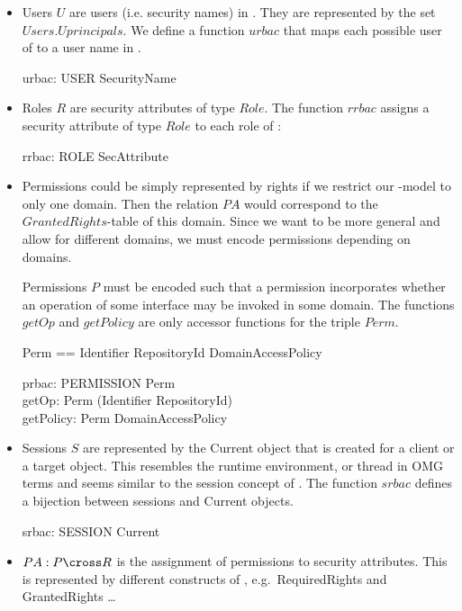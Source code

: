 \begin{itemize}
\item Users $U$ are users (i.e. security names) in \corbasec.  They are
  represented by the set $Users.Uprincipals$.  We define a function $urbac$ that
  maps each possible user of \rbaci{} to a user name in \corbasec.
  \begin{axdef}
    urbac: USER \bij SecurityName \\
  \end{axdef}
\item Roles $R$ are security attributes of type $Role$.  The function $rrbac$
  assigns a security attribute of type $Role$ to each role of \rbaci:
  \begin{axdef}
    rrbac: ROLE \bij SecAttribute \\    
  \end{axdef}
\item Permissions could be simply represented by rights if we restrict our
  \corba -model to only one domain.  Then the relation $PA$ would correspond to
  the $GrantedRights$-table of this domain.  Since we want to be more general
  and allow for different domains, we must encode permissions depending on
  domains.
  
  Permissions $P$ must be encoded such that a permission incorporates whether an
  operation of some interface may be invoked in some domain.  The functions
  $getOp$ and $getPolicy$ are only accessor functions for the triple $Perm$.
  \begin{zed}
    Perm == Identifier \cross RepositoryId \cross DomainAccessPolicy \\
  \end{zed}
  \begin{axdef}
    prbac: PERMISSION \fun Perm \\
    getOp: Perm \fun (Identifier \cross RepositoryId) \\
    getPolicy: Perm \fun DomainAccessPolicy \\
  \end{axdef}
  
\item Sessions $S$ are represented by the Current object that is created for a
  client or a target object.  This resembles the runtime environment, or thread
  in OMG terms and seems similar to the session concept of \rbaci.  The function
  $srbac$ defines a bijection between sessions and Current objects.
  \begin{axdef}
    srbac: SESSION \bij Current \\    
  \end{axdef}
\item $PA: P \cross R$ is the assignment of permissions to security attributes.
  This is represented by different constructs of \corbasec, e.g.\ RequiredRights
  and GrantedRights \dots
  

\end{itemize}
